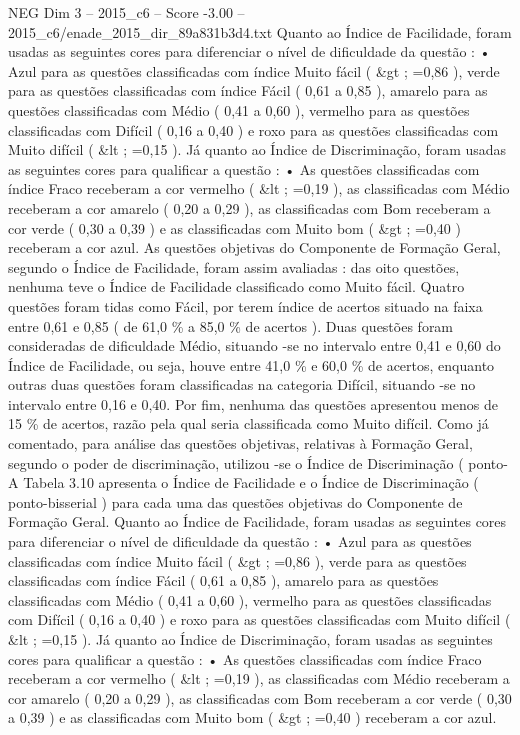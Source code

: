 \begin{textsample}{NEG Dim 3 – 2015\_c6 – Score -3.00 – 2015\_c6/enade\_2015\_dir\_89a831b3d4.txt}
Quanto ao Índice de Facilidade, foram usadas as seguintes cores para diferenciar o nível de dificuldade da questão : • Azul para as questões classificadas com índice Muito fácil ( \&gt ; =0,86 ), verde para as questões classificadas com índice Fácil ( 0,61 a 0,85 ), amarelo para as questões classificadas com Médio ( 0,41 a 0,60 ), vermelho para as questões classificadas com Difícil ( 0,16 a 0,40 ) e roxo para as questões classificadas com Muito difícil ( \&lt ; =0,15 ).
Já quanto ao Índice de Discriminação, foram usadas as seguintes cores para qualificar a questão : • As questões classificadas com índice Fraco receberam a cor vermelho ( \&lt ; =0,19 ), as classificadas com Médio receberam a cor amarelo ( 0,20 a 0,29 ), as classificadas com Bom receberam a cor verde ( 0,30 a 0,39 ) e as classificadas com Muito bom ( \&gt ; =0,40 ) receberam a cor azul.
As questões objetivas do Componente de Formação Geral, segundo o Índice de Facilidade, foram assim avaliadas : das oito questões, nenhuma teve o Índice de Facilidade classificado como Muito fácil.
Quatro questões foram tidas como Fácil, por terem índice de acertos situado na faixa entre 0,61 e 0,85 ( de 61,0 \% a 85,0 \% de acertos ).
Duas questões foram consideradas de dificuldade Médio, situando -se no intervalo entre 0,41 e 0,60 do Índice de Facilidade, ou seja, houve entre 41,0 \% e 60,0 \% de acertos, enquanto outras duas questões foram classificadas na categoria Difícil, situando -se no intervalo entre 0,16 e 0,40.
Por fim, nenhuma das questões apresentou menos de 15 \% de acertos, razão pela qual seria classificada como Muito difícil.
Como já comentado, para análise das questões objetivas, relativas à Formação Geral, segundo o poder de discriminação, utilizou -se o Índice de Discriminação ( ponto- A Tabela 3.10 apresenta o Índice de Facilidade e o Índice de Discriminação ( ponto-bisserial ) para cada uma das questões objetivas do Componente de Formação Geral.
Quanto ao Índice de Facilidade, foram usadas as seguintes cores para diferenciar o nível de dificuldade da questão : • Azul para as questões classificadas com índice Muito fácil ( \&gt ; =0,86 ), verde para as questões classificadas com índice Fácil ( 0,61 a 0,85 ), amarelo para as questões classificadas com Médio ( 0,41 a 0,60 ), vermelho para as questões classificadas com Difícil ( 0,16 a 0,40 ) e roxo para as questões classificadas com Muito difícil ( \&lt ; =0,15 ).
Já quanto ao Índice de Discriminação, foram usadas as seguintes cores para qualificar a questão : • As questões classificadas com índice Fraco receberam a cor vermelho ( \&lt ; =0,19 ), as classificadas com Médio receberam a cor amarelo ( 0,20 a 0,29 ), as classificadas com Bom receberam a cor verde ( 0,30 a 0,39 ) e as classificadas com Muito bom ( \&gt ; =0,40 ) receberam a cor azul.

\end{textsample}

